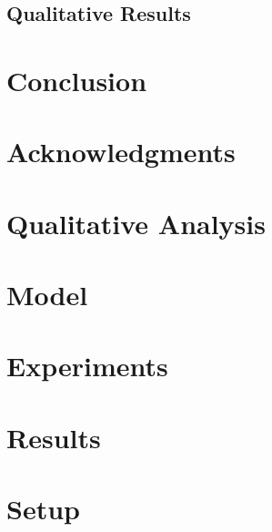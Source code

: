 \documentclass[11pt]{article}
\begin{document}
\subsection{Qualitative Results}
\label{sec:Qualitative}

















\section{Conclusion}
\label{sec:conclusion}






\clearpage
\clearpage
\section*{Acknowledgments}


\clearpage

\appendix
\label{sec:appendix}


\section{Qualitative Analysis}

\section{Model}


\section{Experiments}

\section{Results}

\section{Setup}


\end{document}

